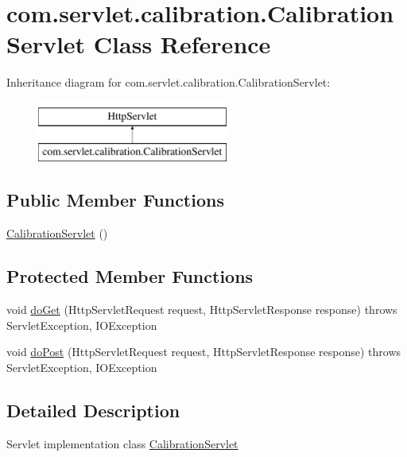 \hypertarget{classcom_1_1servlet_1_1calibration_1_1_calibration_servlet}{}\section{com.\+servlet.\+calibration.\+Calibration\+Servlet Class Reference}
\label{classcom_1_1servlet_1_1calibration_1_1_calibration_servlet}
Inheritance diagram for com.\+servlet.\+calibration.\+Calibration\+Servlet\+:\begin{figure}[H]
\begin{center}
\leavevmode
\includegraphics[height=2.000000cm]{classcom_1_1servlet_1_1calibration_1_1_calibration_servlet}
\end{center}
\end{figure}
\subsection*{Public Member Functions}
\begin{DoxyCompactItemize}
\item 
\hyperlink{classcom_1_1servlet_1_1calibration_1_1_calibration_servlet_a97d66eab0eb041965ef4d683ed68fa1d}{Calibration\+Servlet} ()
\end{DoxyCompactItemize}
\subsection*{Protected Member Functions}
\begin{DoxyCompactItemize}
\item 
void \hyperlink{classcom_1_1servlet_1_1calibration_1_1_calibration_servlet_a7f54f8d6e7fe52b09d7268c8ca34ccf3}{do\+Get} (Http\+Servlet\+Request request, Http\+Servlet\+Response response)  throws Servlet\+Exception, I\+O\+Exception 
\item 
void \hyperlink{classcom_1_1servlet_1_1calibration_1_1_calibration_servlet_a62d52c79d84eaa2e4e32bc5d8ceb235e}{do\+Post} (Http\+Servlet\+Request request, Http\+Servlet\+Response response)  throws Servlet\+Exception, I\+O\+Exception 
\end{DoxyCompactItemize}


\subsection{Detailed Description}
Servlet implementation class \hyperlink{classcom_1_1servlet_1_1calibration_1_1_calibration_servlet}{Calibration\+Servlet} 

